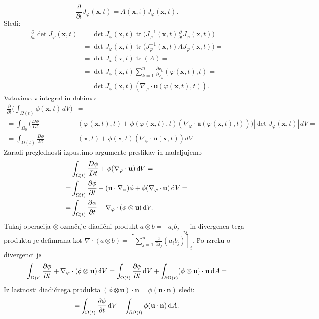 \documentclass[mat2, tisk]{fmfdelo}
\newcommand{\bd}{\textbf}
\begin{document}
\begin{dokaz}
$$
\frac{\partial}{\partial t} J_\varphi(\bd{x}, t) = A(\bd{x}, t) J_\varphi(\bd{x}, t).
$$
Sledi:
\begin{align*}
\frac{\partial}{\partial t} \det{J_\varphi(\bd{x}, t)} &= \det{J_\varphi(\bd{x}, t)} \operatorname{tr}\Big(J_\varphi^{-1}(\bd{x}, t) \frac{\partial}{\partial t} J_\varphi(\bd{x}, t)\Big) = \\
&= \det{J_\varphi(\bd{x}, t)} \operatorname{tr}\Big(J_\varphi^{-1}(\bd{x}, t) A J_\varphi(\bd{x}, t)\Big) = \\
&= \det{J_\varphi(\bd{x}, t)} \operatorname{tr}(A) = \\
&= \det{J_\varphi(\bd{x}, t)} \sum_{k=1}^{n} \frac{\partial u_k}{\partial \varphi_k}(\varphi(\bd{x}, t), t) = \\
&= \det{J_\varphi(\bd{x}, t)} (\nabla_\varphi \cdot \bd{u}(\varphi(\bd{x}, t), t)).
\end{align*}
Vstavimo v integral in dobimo:
\begin{align*}
\frac{\partial}{\partial t} \Big(\int_{\Omega(t)} \phi(\mathbf{x},t)\, dV\Big) &= \\
=\int_{\Omega_0} \Big(\frac{D \phi}{D t}&(\varphi(\bd{x}, t), t) + \phi(\varphi({\mathbf{x}},t), t)(\nabla_\varphi \cdot \bd{u}(\varphi(\bd{x}, t), t)) \Big) |\det{J_\varphi(\bd{x}, t)}| \, dV =\\
= \int_{\Omega(t)} \frac{D \phi}{D t}&(\bd{x}, t) + \phi(\bd{x},t)(\nabla_\varphi \cdot \bd{u}(\bd{x}, t)) dV.
\end{align*}
Zaradi preglednosti izpustimo argumente preslikav in nadaljujemo
\begin{align*}
&\int_{\Omega(t)} \frac{D \phi}{D t} + \phi(\nabla_\varphi \cdot \bd{u}) \dif V = \\
= &\int_{\Omega(t)} \frac{\partial \phi}{\partial t} + (\bd{u} \cdot \nabla_\varphi) \phi + \phi(\nabla_\varphi \cdot \bd{u}) \dif V = \\
= &\int_{\Omega(t)} \frac{\partial \phi}{\partial t} + \nabla_\varphi \cdot (\phi \otimes \bd{u}) \dif V.
\end{align*}
Tukaj operacija $\otimes$ označuje diadični produkt $a\otimes b = [a_i b_j]_{ij}$ in divergenca 
tega produkta je definirana kot $\nabla \cdot (a \otimes b) = [\sum_{j=1}^n \frac{\partial}{\partial x_j} (a_i b_j)]_i$.
Po izreku o divergenci je
\begin{align*}
  \int_{\Omega(t)} \frac{\partial \phi}{\partial t} + \nabla_\varphi \cdot (\phi \otimes \bd{u}) \dif V = \int_{\Omega(t)} \frac{\partial \phi}{\partial t} \dif V + \int_{\partial\Omega(t)} (\phi \otimes \bd{u}) \cdot \bd{n} \dif A =
\end{align*}
Iz lastnosti diadičnega produkta $(\phi \otimes \bd{u}) \cdot \bd{n} = \phi (\bd{u} \cdot \bd{n})$ sledi: 
\begin{align*}
  = \int_{\Omega(t)} \frac{\partial \phi}{\partial t} \dif V + \int_{\partial\Omega(t)} \phi (\bd{u} \cdot \bd{n}) \dif A.
\end{align*}
\end{dokaz}
\end{document}
